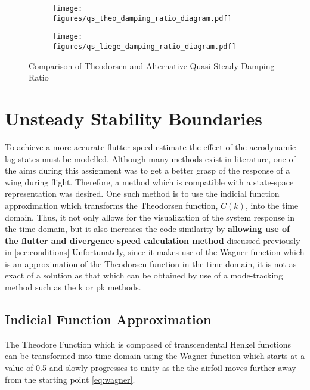 \begin{figure}[H]
    \centering
    \begin{subfigure}[b]{0.5\textwidth}
      \centering
      \texttt{[image: figures/qs\_theo\_damping\_ratio\_diagram.pdf]}
      \label{fig:qs_theo_damping_ratio}
    \end{subfigure}%
    \begin{subfigure}[b]{0.5\textwidth}
      \centering
      \texttt{[image: figures/qs\_liege\_damping\_ratio\_diagram.pdf]}
      \label{fig:qs_liege_damping_ratio}
    \end{subfigure}
    \caption{Comparison of Theodorsen and Alternative Quasi-Steady Damping Ratio} %
    \label{fig:qs_damping_ratio_comp}
\end{figure}

\section{Unsteady Stability Boundaries}
To achieve a more accurate flutter speed estimate the effect of the aerodynamic
lag states must be modelled. Although many methods exist in literature, one of
the aims during this assignment was to get a better grasp of the response of a
wing during flight. Therefore, a method which is compatible with a state-space
representation was desired. One such method is to use the indicial function
approximation which transforms the Theodorsen function, $C(k)$, into the time
domain. Thus, it not only allows for the visualization of the system response
in the time domain, but it also increases the code-similarity by
\textbf{allowing use of the flutter and divergence speed calculation method}
discussed previously in \cref{sec:conditions} Unfortunately, since it makes use
of the Wagner function which is an approximation of the Theodorsen function in
the time domain, it is not as exact of a solution as that which can be obtained
by use of a mode-tracking method such as the k or pk methods.

\subsection{Indicial Function Approximation}
The Theodore Function which is composed of transcendental Henkel functions can
be transformed into time-domain using the Wagner function which starts at a
value of 0.5 and slowly progresses to unity as the the airfoil moves further
away from the starting point \cref{eq:wagner}.

